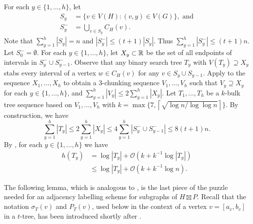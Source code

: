 \documentclass[kpfonts]{patmorin}
\newcommand{\Oh}{\mathcal{O}}
\let\le\leqslant
\let\leq\leqslant
\begin{document}
For each $y\in\{1,\ldots,h\}$, let 
\begin{align*}
S_y&=\{v\in V(H): (v,y)\in V(G)\}, \text{ and}\\
S^-_y&=\textstyle\bigcup_{v\in S_y} C_H(v).
\end{align*}
Note that $\sum_{y=1}^h |S_y| =n$ and $|S_y^-| \leq (t+1)|S_y|$. 
Thus $\sum_{y=1}^h |S_y^-| \leq (t+1)n$. 
Let $S^-_0=\emptyset$. 
For each $y\in\{1,\ldots,h\}$, let $X_y\subset\mathbb{R}$ be the set of all endpoints of intervals in $S^-_y\cup S^-_{y-1}$. 
Observe that any binary search tree $T_y$ with $V(T_y)\supseteq X_y$ stabs every interval of a vertex $w\in C_H(v)$ for any $v\in S_y\cup S_{y-1}$.
Apply  to the sequence $X_1,\ldots,X_h$ to obtain a $3$-chunking sequence $V_1,\ldots,V_{h}$ such that $V_y\supseteq X_y$ for each $y\in\{1,\ldots,h\}$, and $\sum_{y=1}^h |V_y|\le 2\sum_{y=1}^h |X_y|$.
Let $T_1,\ldots,T_h$ be a $k$-bulk tree sequence based on $V_1,\ldots,V_{h}$ with $k=\max\{7,\left\lceil\sqrt{\log n / \log\log n}\right\rceil\}$.
By construction, we have
\[
\textstyle\sum_{y=1}^h |T_y| \le 2\textstyle\sum_{y=1}^h |X_y| \le 4\textstyle\sum_{y=1}^h |S^-_y\cup S^-_{y-1}| \le 8(t+1)n.
\]
By , for each $y\in\{1,\ldots,h\}$ we have
\begin{align*}
h(T_y)&= \log |T_y| + \Oh(k+k^{-1}\log |T_y|)\\
&\leq \log |T_y| + \Oh(k+k^{-1}\log n).
\end{align*}


The following lemma, which is analogous to , is the last piece of the puzzle needed for an adjacency labelling scheme for subgraphs of $H\boxtimes P$. Recall that the notation $\sigma_T(v)$ and $P_T(v)$, used below in the context of a vertex $v=[a_v,b_v]$ in a $t$-tree, has been introduced shortly after .
\end{document}
